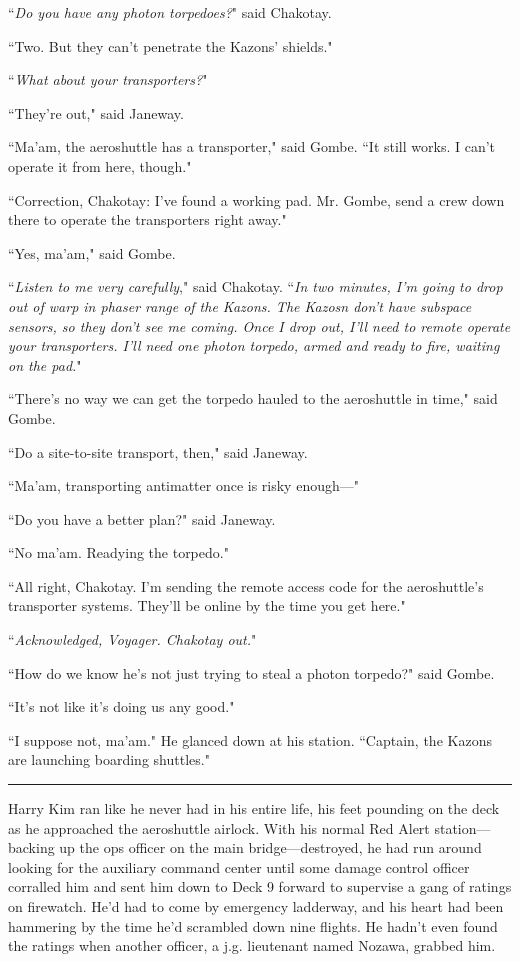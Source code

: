 \documentclass[twoside,letterpaper,12pt]{memoir}
\begin{document}
``\textit{Do you have any photon torpedoes?}" said Chakotay.

``Two. But they can't penetrate the Kazons' shields."

``\textit{What about your transporters?}"

``They're out," said Janeway.

``Ma'am, the aeroshuttle has a transporter," said Gombe. ``It still works. I can't operate it from here, though."

``Correction, Chakotay: I've found a working pad. Mr. Gombe, send a crew down there to operate the transporters right away."

``Yes, ma'am," said Gombe.

``\textit{Listen to me very carefully}," said Chakotay. ``\textit{In two minutes, I'm going to drop out of warp in phaser range of the Kazons. The Kazosn don't have subspace sensors, so they don't see me coming. Once I drop out, I'll need to remote operate your transporters. I’ll need one photon torpedo, armed and ready to fire, waiting on the pad.}"

``There's no way we can get the torpedo hauled to the aeroshuttle in time," said Gombe.

``Do a site-to-site transport, then," said Janeway.

``Ma'am, transporting antimatter once is risky enough---"

``Do you have a better plan?" said Janeway.

``No ma'am. Readying the torpedo."

``All right, Chakotay. I'm sending the remote access code for the aeroshuttle's transporter systems. They'll be online by the time you get here."

``\textit{Acknowledged, Voyager. Chakotay out.}"

``How do we know he's not just trying to steal a photon torpedo?" said Gombe.

``It's not like it's doing us any good."

``I suppose not, ma'am." He glanced down at his station. ``Captain, the Kazons are launching boarding shuttles."

\fancybreak{\rule{3cm}{0.4 pt}}
Harry Kim ran like he never had in his entire life, his feet pounding on the deck as he approached the aeroshuttle airlock. With his normal Red Alert station---backing up the ops officer on the main bridge---destroyed, he had run around looking for the auxiliary command center until some damage control officer corralled him and sent him down to Deck 9 forward to supervise a gang of ratings on firewatch. He'd had to come by emergency ladderway, and his heart had been hammering by the time he'd scrambled down nine flights. He hadn't even found the ratings when another officer, a j.g. lieutenant named Nozawa, grabbed him.
\end{document}
